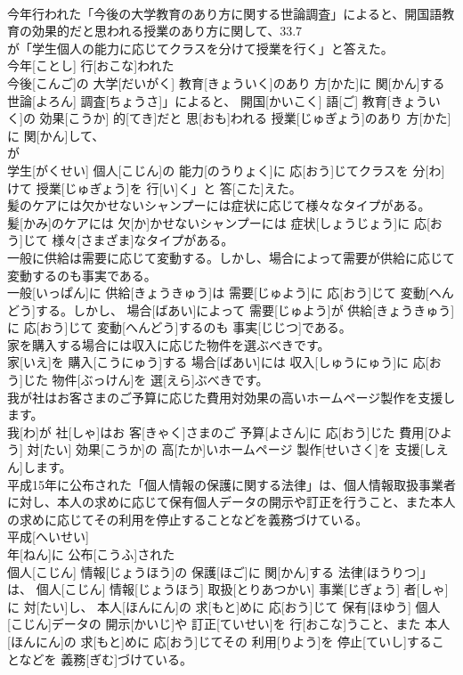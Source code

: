 \documentclass[8pt]{extreport}
\begin{document}
\begin{CJK}{UTF8}{min}
\\	今年行われた「今後の大学教育のあり方に関する世論調査」によると、開国語教育の効果的だと思われる授業のあり方に関して、33.7
\\	が「学生個人の能力に応じてクラスを分けて授業を行く」と答えた。	
\\	今年[ことし] 行[おこな]われた
\\	今後[こんご]の 大学[だいがく] 教育[きょういく]のあり 方[かた]に 関[かん]する 世論[よろん] 調査[ちょうさ]」によると、 開国[かいこく] 語[ご] 教育[きょういく]の 効果[こうか] 的[てき]だと 思[おも]われる 授業[じゅぎょう]のあり 方[かた]に 関[かん]して、 
\\	が
\\	学生[がくせい] 個人[こじん]の 能力[のうりょく]に 応[おう]じてクラスを 分[わ]けて 授業[じゅぎょう]を 行[い]く」と 答[こた]えた。
\\	髪のケアには欠かせないシャンプーには症状に応じて様々なタイプがある。	
\\	髪[かみ]のケアには 欠[か]かせないシャンプーには 症状[しょうじょう]に 応[おう]じて 様々[さまざま]なタイプがある。
\\	一般に供給は需要に応じて変動する。しかし、場合によって需要が供給に応じて変動するのも事実である。	
\\	一般[いっぱん]に 供給[きょうきゅう]は 需要[じゅよう]に 応[おう]じて 変動[へんどう]する。しかし、 場合[ばあい]によって 需要[じゅよう]が 供給[きょうきゅう]に 応[おう]じて 変動[へんどう]するのも 事実[じじつ]である。
\\	家を購入する場合には収入に応じた物件を選ぶべきです。	
\\	家[いえ]を 購入[こうにゅう]する 場合[ばあい]には 収入[しゅうにゅう]に 応[おう]じた 物件[ぶっけん]を 選[えら]ぶべきです。
\\	我が社はお客さまのご予算に応じた費用対効果の高いホームページ製作を支援します。	
\\	我[わ]が 社[しゃ]はお 客[きゃく]さまのご 予算[よさん]に 応[おう]じた 費用[ひよう] 対[たい] 効果[こうか]の 高[たか]いホームページ 製作[せいさく]を 支援[しえん]します。
\\	平成15年に公布された「個人情報の保護に関する法律」は、個人情報取扱事業者に対し、本人の求めに応じて保有個人データの開示や訂正を行うこと、また本人の求めに応じてその利用を停止することなどを義務づけている。	
\\	平成[へいせい] 
\\	年[ねん]に 公布[こうふ]された
\\	個人[こじん] 情報[じょうほう]の 保護[ほご]に 関[かん]する 法律[ほうりつ]」は、 個人[こじん] 情報[じょうほう] 取扱[とりあつかい] 事業[じぎょう] 者[しゃ]に 対[たい]し、 本人[ほんにん]の 求[もと]めに 応[おう]じて 保有[ほゆう] 個人[こじん]データの 開示[かいじ]や 訂正[ていせい]を 行[おこな]うこと、また 本人[ほんにん]の 求[もと]めに 応[おう]じてその 利用[りよう]を 停止[ていし]することなどを 義務[ぎむ]づけている。

\end{CJK}
\end{document}
